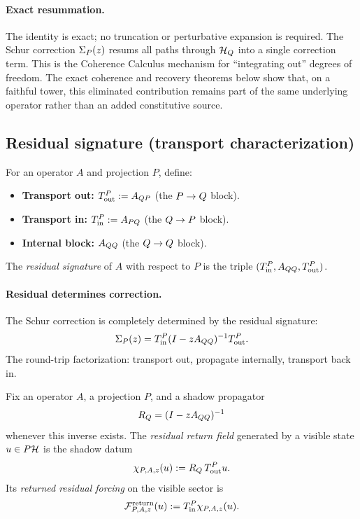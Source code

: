 \paragraph{Exact resummation.}
The identity is exact; no truncation or perturbative expansion is required.
The Schur correction $\Sigma_{P}(z)$ resums all paths through $\mathcal{H}_{Q}$ into a single correction term.
This is the Coherence Calculus mechanism for ``integrating out'' degrees of freedom.
The exact coherence and recovery theorems below show that, on a faithful tower,
this eliminated contribution remains part of the same underlying operator rather
than an added constitutive source.

\subsection{Residual signature (transport characterization)}

\begin{definition}
\label{def:residual-signature}
For an operator $A$ and projection $P$, define:
\begin{itemize}[itemsep=0.2em]
\item \textbf{Transport out:} $T_{\mathrm{out}}^{P} := A_{QP}$ (the $P \to Q$ block).
\item \textbf{Transport in:} $T_{\mathrm{in}}^{P} := A_{PQ}$ (the $Q \to P$ block).
\item \textbf{Internal block:} $A_{QQ}$ (the $Q \to Q$ block).
\end{itemize}
The \emph{residual signature} of $A$ with respect to $P$ is the triple $(T_{\mathrm{in}}^{P}, A_{QQ}, T_{\mathrm{out}}^{P})$.
\end{definition}

\paragraph{Residual determines correction.}
The Schur correction is completely determined by the residual signature:
\[
\Sigma_{P}(z) = T_{\mathrm{in}}^{P} (I - z A_{QQ})^{-1} T_{\mathrm{out}}^{P}.
\]
The round-trip factorization: transport out, propagate internally, transport back in.

\begin{definition}
\label{def:residual-return-field}
Fix an operator \(A\), a projection \(P\), and a shadow propagator
\[
R_Q=(I-zA_{QQ})^{-1}
\]
whenever this inverse exists. The \emph{residual return field} generated by a
visible state \(u\in P\mathcal{H}\) is the shadow datum
\[
\chi_{P,A,z}(u):=R_Q\,T_{\mathrm{out}}^{P}u.
\]
Its \emph{returned residual forcing} on the visible sector is
\[
\mathcal F^{\mathrm{return}}_{P,A,z}(u)
:=
T_{\mathrm{in}}^{P}\chi_{P,A,z}(u).
\]
\end{definition}

